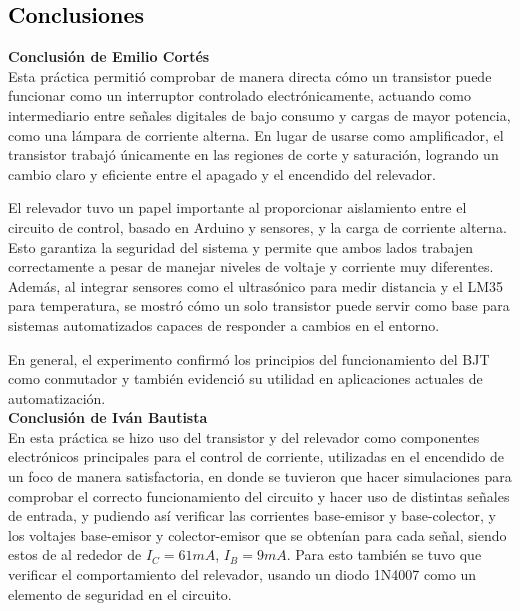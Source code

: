 \textcolor{black}{\section{Conclusiones}}
\textbf{Conclusión de Emilio Cortés}\\
\noindent Esta práctica permitió comprobar de manera directa cómo un transistor puede funcionar como un interruptor controlado electrónicamente, actuando como intermediario entre señales digitales de bajo consumo y cargas de mayor potencia, como una lámpara de corriente alterna. En lugar de usarse como amplificador, el transistor trabajó únicamente en las regiones de corte y saturación, logrando un cambio claro y eficiente entre el apagado y el encendido del relevador.

El relevador tuvo un papel importante al proporcionar aislamiento entre el circuito de control, basado en Arduino y sensores, y la carga de corriente alterna. Esto garantiza la seguridad del sistema y permite que ambos lados trabajen correctamente a pesar de manejar niveles de voltaje y corriente muy diferentes. Además, al integrar sensores como el ultrasónico para medir distancia y el LM35 para temperatura, se mostró cómo un solo transistor puede servir como base para sistemas automatizados capaces de responder a cambios en el entorno.

En general, el experimento confirmó los principios del funcionamiento del BJT como conmutador y también evidenció su utilidad en aplicaciones actuales de automatización.\\

\textbf{Conclusión de Iván Bautista}\\
\noindent En esta práctica se hizo uso del transistor y del relevador como componentes electrónicos principales para el control de corriente, utilizadas en el encendido de un foco de manera satisfactoria, en donde se tuvieron que hacer simulaciones para comprobar el correcto funcionamiento del circuito y hacer uso de distintas señales de entrada, y pudiendo así verificar las corrientes base-emisor y base-colector, y los voltajes base-emisor y colector-emisor que se obtenían para cada señal, siendo estos de al rededor de $I_{C} = 61 mA$, $I_{B} = 9 mA$. Para esto también se tuvo que verificar el comportamiento del relevador, usando un diodo 1N4007 como un elemento de seguridad en el circuito.\\

